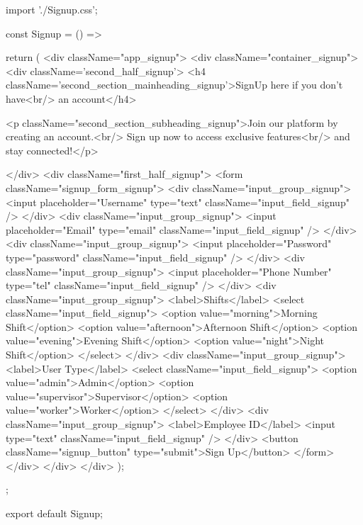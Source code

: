 
import './Signup.css';

const Signup = () => {
  return (
    <div className="app_signup">
      <div className="container_signup">
      <div className='second_half_signup'>
            <h4 className='second_section_mainheading_signup'>SignUp here if you don't have<br/> an account</h4>
            
             <p className="second_section_subheading_signup">Join our platform by creating an account.<br/> Sign up now to access exclusive features<br/> and stay connected!</p>

          </div>
        <div className="first_half_signup">
          <form className="signup_form_signup">
            <div className="input_group_signup">
              <input placeholder="Username" type="text" className="input_field_signup" />
            </div>
            <div className="input_group_signup">
              <input placeholder="Email" type="email" className="input_field_signup" />
            </div>
            <div className="input_group_signup">
              <input placeholder="Password" type="password" className="input_field_signup" />
            </div>
            <div className="input_group_signup">
              <input placeholder="Phone Number" type="tel" className="input_field_signup" />
            </div>
            <div className="input_group_signup">
              <label>Shifts</label>
              <select className="input_field_signup">
                <option value="morning">Morning Shift</option>
                <option value="afternoon">Afternoon Shift</option>
                <option value="evening">Evening Shift</option>
                <option value="night">Night Shift</option>
              </select>
            </div>
            <div className="input_group_signup">
              <label>User Type</label>
              <select className="input_field_signup">
                <option value="admin">Admin</option>
                <option value="supervisor">Supervisor</option>
                <option value="worker">Worker</option>
              </select>
            </div>
            <div className="input_group_signup">
              <label>Employee ID</label>
              <input type="text" className="input_field_signup" />
            </div>
            <button className="signup_button" type="submit">Sign Up</button>
          </form>
        </div>
      </div>
    </div>
  );
};

export default Signup;




